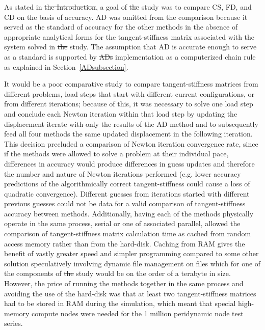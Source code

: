 \documentclass[preprint,12pt]{elsarticle}
\providecommand{\DIFaddtex}[1]{{\protect\color{blue}\uwave{#1}}} %
\providecommand{\DIFdeltex}[1]{{\protect\color{red}\sout{#1}}}                      %
\providecommand{\DIFaddbegin}{} %
\providecommand{\DIFaddend}{} %
\providecommand{\DIFdelbegin}{} %
\providecommand{\DIFdelend}{} %
\providecommand{\DIFadd}[1]{\texorpdfstring{\DIFaddtex{#1}}{#1}} %
\providecommand{\DIFdel}[1]{\texorpdfstring{\DIFdeltex{#1}}{}} %
\begin{document}
\DIFaddend As stated in \DIFdelbegin \DIFdel{the Introduction}\DIFdelend \DIFaddbegin \DIFadd{Section~\ref{sec:intro}}\DIFaddend , a goal of \DIFdelbegin \DIFdel{the }\DIFdelend \DIFaddbegin \DIFadd{this }\DIFaddend study was to compare CS, FD, and CD on the basis of accuracy. AD was omitted from the comparison because it served as the standard of accuracy for the other methods in the absence of appropriate analytical forms for the tangent-stiffness matrix associated with the system solved in \DIFdelbegin \DIFdel{the }\DIFdelend \DIFaddbegin \DIFadd{this }\DIFaddend study. The assumption that AD is accurate enough to serve as a standard is supported by \DIFdelbegin \DIFdel{ADs }\DIFdelend \DIFaddbegin \DIFadd{AD's }\DIFaddend implementation as a computerized chain rule as explained in Section~\ref{ADsubsection}.

It would be a poor comparative study to compare tangent-stiffness matrices from different problems, load steps that start with different current configurations, or from different iterations; because of this, it was necessary to solve one load step and conclude each Newton iteration within that load step by updating the displacement iterate with only the results of the AD method and to subsequently feed all four methods the same updated displacement in the following iteration. This decision precluded a comparison of Newton iteration convergence rate, since if the methods were allowed to solve a problem at their individual pace, differences in accuracy would produce differences in guess updates and therefore the number and nature of Newton iterations performed (e.g. lower accuracy predictions of the algorithmically correct tangent-stiffness \DIFaddbegin \DIFadd{matrix }\DIFaddend could cause a loss of quadratic convergence).  Different guesses from iterations started with different previous guesses could not be data for a valid comparison of tangent-stiffness \DIFaddbegin \DIFadd{matrix }\DIFaddend accuracy between methods.  Additionally, having each of the methods physically operate in the same process, serial or one of associated parallel, allowed the comparison of tangent-stiffness matrix calculation time as cached from random access memory rather than from the hard-disk.  Caching from RAM gives the benefit of vastly greater speed and simpler programming compared to some other solution speculatively involving dynamic file management on files which for one of the components of \DIFdelbegin \DIFdel{the }\DIFdelend \DIFaddbegin \DIFadd{this }\DIFaddend study would be on the order of a terabyte in size. However, the price of running the methods together in the same process and avoiding the use of the hard-disk was that at least two tangent-stiffness matrices had to be stored in RAM during the simulation, which meant that special high-memory compute nodes were needed for the 1 million peridynamic node test series.
\end{document}
